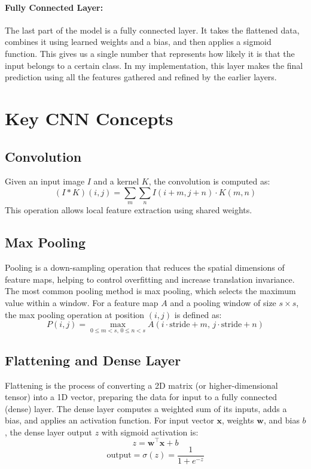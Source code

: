 \documentclass[conference]{IEEEtran}
\begin{document}
\paragraph{Fully Connected Layer:} The last part of the model is a fully connected layer. It takes the flattened data, combines it using learned weights and a bias, and then applies a sigmoid function. This gives us a single number that represents how likely it is that the input belongs to a certain class. In my implementation, this layer makes the final prediction using all the features gathered and refined by the earlier layers.

\section{Key CNN Concepts}
\subsection{Convolution}
Given an input image $I$ and a kernel $K$, the convolution is computed as:
\[
(I * K)(i,j) = \sum_m \sum_n I(i+m, j+n) \cdot K(m,n)
\]
This operation allows local feature extraction using shared weights.

\subsection{Max Pooling}
Pooling is a down-sampling operation that reduces the spatial dimensions of feature maps, helping to control overfitting and increase translation invariance. The most common pooling method is max pooling, which selects the maximum value within a window. For a feature map $A$ and a pooling window of size $s \times s$, the max pooling operation at position $(i, j)$ is defined as:
\[
P(i, j) = \max_{0 \leq m < s,\, 0 \leq n < s} A(i \cdot \text{stride} + m,\, j \cdot \text{stride} + n)
\]

\subsection{Flattening and Dense Layer}
Flattening is the process of converting a 2D matrix (or higher-dimensional tensor) into a 1D vector, preparing the data for input to a fully connected (dense) layer. The dense layer computes a weighted sum of its inputs, adds a bias, and applies an activation function. For input vector $\mathbf{x}$, weights $\mathbf{w}$, and bias $b$, the dense layer output $z$ with sigmoid activation is:
\[
z = \mathbf{w}^\top \mathbf{x} + b
\]
\[
\text{output} = \sigma(z) = \frac{1}{1 + e^{-z}}
\]
\end{document}
